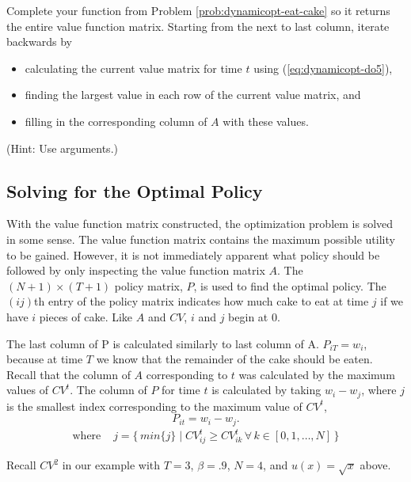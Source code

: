 \begin{problem}
Complete your function from Problem \ref{prob:dynamicopt-eat-cake} so it returns the entire value function matrix.
Starting from the next to last column, iterate backwards by
\begin{itemize}
\item calculating the current value matrix for time $t$ using (\ref{eq:dynamicopt-do5}),
\item finding the largest value in each row of the current value matrix, and
\item filling in the corresponding column of $A$ with these values.
\end{itemize}
(Hint: Use  arguments.)
\end{problem}

\subsection*{Solving for the Optimal Policy} %

With the value function matrix constructed, the optimization problem is solved in some sense.
The value function matrix contains the maximum possible utility to be gained.
However, it is not immediately apparent what policy should be followed by only inspecting the value function matrix $A$.
The $(N+1) \times (T+1)$ policy matrix, $P$, is used to find the optimal policy.
The $(ij)$th entry of the policy matrix indicates how much cake to eat at time $j$ if we have $i$ pieces of cake.
Like $A$ and $CV$, $i$ and $j$ begin at $0$.

The last column of P is calculated similarly to last column of A.
$P_{iT} = w_i$, because at time $T$ we know that the remainder of the cake should be eaten.
Recall that the column of $A$ corresponding to $t$ was calculated by the maximum values of $CV^{t}$.
The column of $P$ for time $t$ is calculated by taking $w_i - w_j$, where $j$ is the smallest index corresponding to the maximum value of $CV^{t}$,
\[
P_{it} = w_i - w_j.
\]
\begin{align*}
\mbox{where} \, \, & j = \{\, min\{j\} \mid CV_{ij}^t \geq CV_{ik}^t \, \forall \, k \in \left[0,1, \ldots , N \right] \,\}
\end{align*}

Recall $CV^2$ in our example with $T=3$, $\beta=.9$, $N=4$, and $u(x) = \sqrt{x}$ above.

